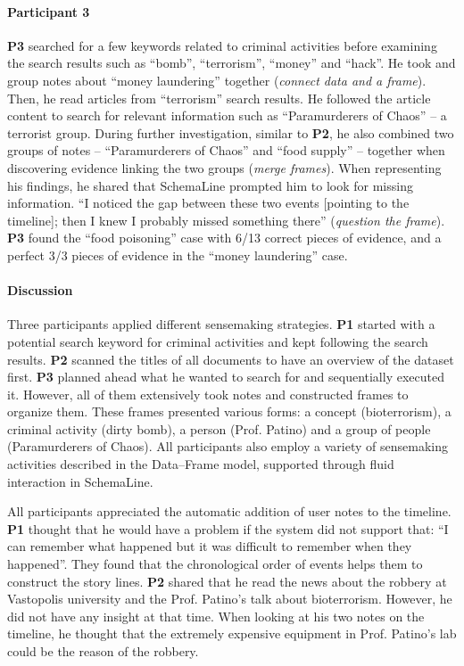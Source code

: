 \paragraph{Participant 3}
\textbf{P3} searched for a few keywords related to criminal activities before examining the search results such as ``bomb'', ``terrorism'', ``money'' and ``hack''. He took and group notes about ``money laundering'' together (\emph{connect data and a frame}). Then, he read articles from ``terrorism'' search results. He followed the article content to search for relevant information such as ``Paramurderers of Chaos'' -- a terrorist group. During further investigation, similar to \textbf{P2}, he also combined two groups of notes -- ``Paramurderers of Chaos'' and ``food supply'' -- together when discovering evidence linking the two groups (\emph{merge frames}). When representing his findings, he shared that SchemaLine prompted him to look for missing information. ``I noticed the gap between these two events [pointing to the timeline]; then I knew I probably missed something there'' (\emph{question the frame}). \textbf{P3} found the ``food poisoning'' case with 6/13 correct pieces of evidence, and a perfect 3/3 pieces of evidence in the ``money laundering'' case. 

\paragraph{Discussion}
Three participants applied different sensemaking strategies. \textbf{P1} started with a potential search keyword for criminal activities and kept following the search results. \textbf{P2} scanned the titles of all documents to have an overview of the dataset first. \textbf{P3} planned ahead what he wanted to search for and sequentially executed it. However, all of them extensively took notes and constructed frames to organize them. These frames presented various forms: a concept (bioterrorism), a criminal activity (dirty bomb), a person (Prof. Patino) and a group of people (Paramurderers of Chaos). All participants also employ a variety of sensemaking activities described in the Data--Frame model, supported through fluid interaction in SchemaLine.

All participants appreciated the automatic addition of user notes to the timeline. \textbf{P1} thought that he would have a problem if the system did not support that: ``I can remember what happened but it was difficult to remember when they happened''. They found that the chronological order of events helps them to construct the story lines. \textbf{P2} shared that he read the news about the robbery at Vastopolis university and the Prof. Patino's talk about bioterrorism. However, he did not have any insight at that time. When looking at his two notes on the timeline, he thought that the extremely expensive equipment in Prof. Patino's lab could be the reason of the robbery. 

